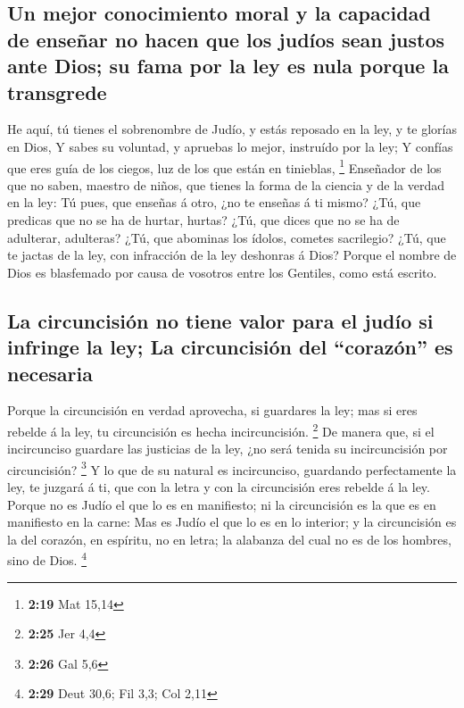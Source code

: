 \hypertarget{un-mejor-conocimiento-moral-y-la-capacidad-de-enseuxf1ar-no-hacen-que-los-juduxedos-sean-justos-ante-dios-su-fama-por-la-ley-es-nula-porque-la-transgrede}{%
\subsection{Un mejor conocimiento moral y la capacidad de enseñar no
hacen que los judíos sean justos ante Dios; su fama por la ley es nula
porque la
transgrede}\label{un-mejor-conocimiento-moral-y-la-capacidad-de-enseuxf1ar-no-hacen-que-los-juduxedos-sean-justos-ante-dios-su-fama-por-la-ley-es-nula-porque-la-transgrede}}

 He aquí, tú tienes el sobrenombre de Judío, y estás
reposado en la ley, y te glorías en Dios,  Y sabes su
voluntad, y apruebas lo mejor, instruído por la ley;  Y
confías que eres guía de los ciegos, luz de los que están en tinieblas,
\footnote{\textbf{2:19} Mat 15,14}  Enseñador de los que
no saben, maestro de niños, que tienes la forma de la ciencia y de la
verdad en la ley:  Tú pues, que enseñas á otro, ¿no te
enseñas á ti mismo? ¿Tú, que predicas que no se ha de hurtar, hurtas?
 ¿Tú, que dices que no se ha de adulterar, adulteras?
¿Tú, que abominas los ídolos, cometes sacrilegio?  ¿Tú,
que te jactas de la ley, con infracción de la ley deshonras á Dios?
 Porque el nombre de Dios es blasfemado por causa de
vosotros entre los Gentiles, como está escrito.

\hypertarget{la-circuncisiuxf3n-no-tiene-valor-para-el-juduxedo-si-infringe-la-ley-la-circuncisiuxf3n-del-corazuxf3n-es-necesaria}{%
\subsection{La circuncisión no tiene valor para el judío si infringe la
ley; La circuncisión del ``corazón'' es
necesaria}\label{la-circuncisiuxf3n-no-tiene-valor-para-el-juduxedo-si-infringe-la-ley-la-circuncisiuxf3n-del-corazuxf3n-es-necesaria}}

 Porque la circuncisión en verdad aprovecha, si guardares
la ley; mas si eres rebelde á la ley, tu circuncisión es hecha
incircuncisión. \footnote{\textbf{2:25} Jer 4,4}  De
manera que, si el incircunciso guardare las justicias de la ley, ¿no
será tenida su incircuncisión por circuncisión? \footnote{\textbf{2:26}
  Gal 5,6}  Y lo que de su natural es incircunciso,
guardando perfectamente la ley, te juzgará á ti, que con la letra y con
la circuncisión eres rebelde á la ley.  Porque no es
Judío el que lo es en manifiesto; ni la circuncisión es la que es en
manifiesto en la carne:  Mas es Judío el que lo es en lo
interior; y la circuncisión es la del corazón, en espíritu, no en letra;
la alabanza del cual no es de los hombres, sino de Dios. \footnote{\textbf{2:29}
  Deut 30,6; Fil 3,3; Col 2,11}

